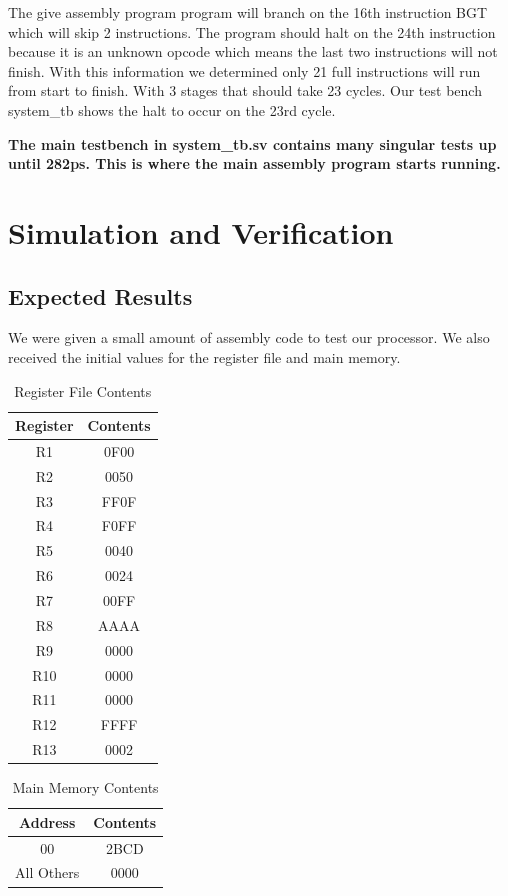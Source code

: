             The give assembly program program will branch on the 16th instruction BGT which will skip 2 instructions. The program should halt on the 24th instruction because it is an unknown
            opcode which means the last two instructions will not finish.
            With this information we determined only 21 full instructions will run from start to finish. With 3 stages that should take 23 cycles.
            Our test bench system\_tb shows the halt to occur on the 23rd cycle. 


            \textbf{The main testbench in system\_tb.sv contains many singular tests up until 282ps. This is where the main assembly program starts running. }

	\section{Simulation and Verification}
	\subsection{Expected Results}
	We were given a small amount of assembly code to test our processor. We also
	received the initial values for the register file and main memory. 
	
	
	\begin{table}[htbp]
	   \caption{Register File Contents}
	   \label{regfi}
	   \centering
	   \begin{tabular}{ c | c }
	   Register         & Contents    \\
	   \hline
	   R1  &   0F00        \\
       R2  &   0050        \\
       R3  &   FF0F        \\
       R4  &   F0FF        \\
       R5  &   0040        \\
       R6  &   0024        \\
       R7  &   00FF        \\
       R8  &   AAAA        \\
       R9  &   0000        \\
       R10 &   0000        \\
       R11 &   0000        \\
       R12 &   FFFF        \\
       R13 &   0002        \\
	   \end{tabular}
	\end{table}
    \begin{table}[htbp]
       \caption{Main Memory Contents}
       \label{mainme}
       \centering
       \begin{tabular}{ c | c }
       Address         & Contents    \\
       \hline
       00  &   2BCD        \\
       All Others  &   0000        \\
       
       \end{tabular}
    \end{table}
    
